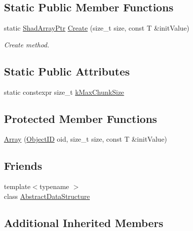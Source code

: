 \subsection*{Static Public Member Functions}
\begin{DoxyCompactItemize}
\item 
static \hyperlink{classshad_1_1Array_a5ff91c72815df47db60fc6ed44b01d46}{Shad\-Array\-Ptr} \hyperlink{classshad_1_1Array_a4ff830861f0ace4bf0a5e39e400b50f8}{Create} (size\-\_\-t size, const T \&init\-Value)
\begin{DoxyCompactList}\small\item\em Create method. \end{DoxyCompactList}\end{DoxyCompactItemize}
\subsection*{Static Public Attributes}
\begin{DoxyCompactItemize}
\item 
static constexpr size\-\_\-t \hyperlink{classshad_1_1Array_af4d2703149c199273eae358d1bcd8ade}{k\-Max\-Chunk\-Size}
\end{DoxyCompactItemize}
\subsection*{Protected Member Functions}
\begin{DoxyCompactItemize}
\item 
\hyperlink{classshad_1_1Array_a651339c6f76aea1b4f5120ebfc46bdd0}{Array} (\hyperlink{classshad_1_1Array_a69c0b0424c09d4779081e358548a3165}{Object\-I\-D} oid, size\-\_\-t size, const T \&init\-Value)
\end{DoxyCompactItemize}
\subsection*{Friends}
\begin{DoxyCompactItemize}
\item 
{\footnotesize template$<$typename $>$ }\\class \hyperlink{classshad_1_1Array_ab18afa4496cc863ddc11bab94b2adf57}{Abstract\-Data\-Structure}
\end{DoxyCompactItemize}
\subsection*{Additional Inherited Members}


